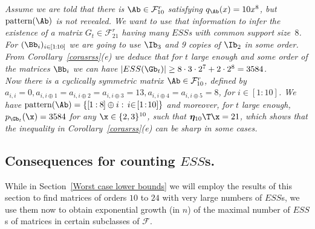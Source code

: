 \documentclass[moor]{informs3}              %
\def\irg#1#2{{ \in\! [{#1}\! : \! {#2}]}}
\def\sirg#1#2{{ \in\kern-.5pt [{#1}\kern-.5pt : \kern-.5pt {#2}]}}
\def\rg#1#2{{ [\kern-.5pt{#1}\kern-.5pt : \kern-.5pt {#2}\kern-.5pt]}}
\begin{document}
\begin{exa}\label{e:21}
\emph{Assume we are told that there is $\Ab\in{\mathcal F}^r_{10}$ satisfying $q_{\Ab}(x)=10x^8$, but $\textup{pattern}(\Ab)$ is not revealed.
We want to use that information to infer the existence of a matrix $G_t\in{\mathcal F}^r_{21}$ having many $ESS$s with common support size~$8$.
For $(\Bb_i)_{i\sirg 1{10}}$ we are going to use $\Ib_3$ and 9 copies of $\Ib_2$ in some order. From Corollary~\ref{corasrss}(e) we deduce that for $t$ large enough and some order of the matrices $\Bb_i$ we can have
$|ESS(\Gb_t)|\ge8\cdot3\cdot2^7+2\cdot2^8=3584$.\\
Now there is a cyclically symmetric matrix $\Ab\in{\mathcal F}^r_{10}$, defined by $a_{i,i}=0, a_{i,i\oplus1}=a_{i,i\oplus2}=a_{i,i\oplus3}=13, a_{i,i\oplus4}=a_{i,i\oplus5}=8$, for $i\irg 1{10}$. We have
$\textup{pattern}(\Ab)=\{\rg 18\oplus i:\,i\irg 1{10}\}$ and moreover, for $t$ large enough,
$p_{\Gb_t}(\x)=3584$ for any $\x\in\{2,3\}^{10}$, such that $\bm{\eta}_{10}\T\x=21$, which shows that the inequality in Corollary~\ref{corasrss}(e) can be sharp in some cases.
}
\end{exa}


\subsection{Consequences for counting $ESS$s.}\label{seccount}

While in Section~\ref{Worst case lower bounds} we will employ the results of this section to find matrices of orders $10$ to $24$ with very large numbers of $ESS$s,
we use them now to obtain exponential growth (in $n$) of the maximal number of $ESS$s of matrices in certain subclasses of $\mathcal{F}$.
\end{document}
